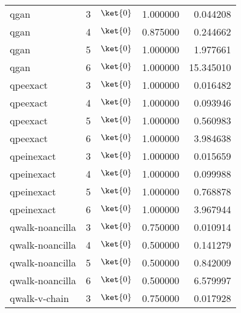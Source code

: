 \begin{table}
{{\begin{minipage}[t]{0.5\textwidth}
\begin{tabular}{lrlrr}
    qgan & 3 & $\ket{0}$ & 1.000000 & 0.044208 \\
    qgan & 4 & $\ket{0}$ & 0.875000 & 0.244662 \\
    qgan & 5 & $\ket{0}$ & 1.000000 & 1.977661 \\
    qgan & 6 & $\ket{0}$ & 1.000000 & 15.345010 \\
    \midrule
    qpeexact & 3 & $\ket{0}$ & 1.000000 & 0.016482 \\
    qpeexact & 4 & $\ket{0}$ & 1.000000 & 0.093946 \\
    qpeexact & 5 & $\ket{0}$ & 1.000000 & 0.560983 \\
    qpeexact & 6 & $\ket{0}$ & 1.000000 & 3.984638 \\
    \midrule
    qpeinexact & 3 & $\ket{0}$ & 1.000000 & 0.015659 \\
    qpeinexact & 4 & $\ket{0}$ & 1.000000 & 0.099988 \\
    qpeinexact & 5 & $\ket{0}$ & 1.000000 & 0.768878 \\
    qpeinexact & 6 & $\ket{0}$ & 1.000000 & 3.967944 \\
    \midrule
    qwalk-noancilla & 3 & $\ket{0}$ & 0.750000 & 0.010914 \\
    qwalk-noancilla & 4 & $\ket{0}$ & 0.500000 & 0.141279 \\
    qwalk-noancilla & 5 & $\ket{0}$ & 0.500000 & 0.842009 \\
    qwalk-noancilla & 6 & $\ket{0}$ & 0.500000 & 6.579997 \\
    \midrule
    qwalk-v-chain & 3 & $\ket{0}$ & 0.750000 & 0.017928 \\

\end{tabular}
\end{minipage}}}
\end{table}
